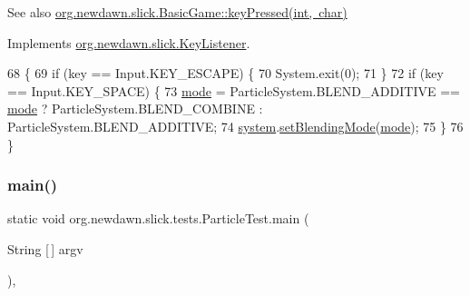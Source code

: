 \begin{DoxySeeAlso}{See also}
\mbox{\hyperlink{classorg_1_1newdawn_1_1slick_1_1_basic_game_a4fbb3345b5abf5ddd54a99466d07f02f}{org.\+newdawn.\+slick.\+Basic\+Game\+::key\+Pressed(int, char)}} 
\end{DoxySeeAlso}


Implements \mbox{\hyperlink{interfaceorg_1_1newdawn_1_1slick_1_1_key_listener_ac0b0568a21ef486c4f51382614c196ef}{org.\+newdawn.\+slick.\+Key\+Listener}}.


\begin{DoxyCode}
68                                             \{
69         \textcolor{keywordflow}{if} (key == Input.KEY\_ESCAPE) \{
70             System.exit(0);
71         \}
72         \textcolor{keywordflow}{if} (key == Input.KEY\_SPACE) \{
73             \mbox{\hyperlink{classorg_1_1newdawn_1_1slick_1_1tests_1_1_particle_test_a3672703408b8d6f2d94e63765339d4a8}{mode}} = ParticleSystem.BLEND\_ADDITIVE == \mbox{\hyperlink{classorg_1_1newdawn_1_1slick_1_1tests_1_1_particle_test_a3672703408b8d6f2d94e63765339d4a8}{mode}} ? ParticleSystem.BLEND\_COMBINE : 
      ParticleSystem.BLEND\_ADDITIVE;
74             \mbox{\hyperlink{classorg_1_1newdawn_1_1slick_1_1tests_1_1_particle_test_a6daed8a7245faff147f4e66159df9c0d}{system}}.\mbox{\hyperlink{classorg_1_1newdawn_1_1slick_1_1particles_1_1_particle_system_a430d7e9a09b132694497f4e6075cd58c}{setBlendingMode}}(\mbox{\hyperlink{classorg_1_1newdawn_1_1slick_1_1tests_1_1_particle_test_a3672703408b8d6f2d94e63765339d4a8}{mode}});
75         \}
76     \}
\end{DoxyCode}
\mbox{\label{classorg_1_1newdawn_1_1slick_1_1tests_1_1_particle_test_aa708c2723baf40eb37de30abf2c5f556}} 
\subsubsection{\texorpdfstring{main()}{main()}}
{\footnotesize\ttfamily static void org.\+newdawn.\+slick.\+tests.\+Particle\+Test.\+main (\begin{DoxyParamCaption}\item[{String \mbox{[}$\,$\mbox{]}}]{argv }\end{DoxyParamCaption})\hspace{0.3cm}{\ttfamily [inline]}, {\ttfamily [static]}}

